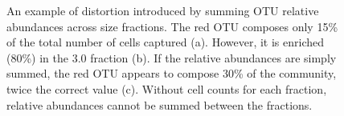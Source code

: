 \begin{figure}
\quad
{}
\caption[Summing relative abundances across size fractions]{An example of distortion introduced by summing OTU relative abundances across size fractions. The red OTU composes only 15\% of the total number of cells captured (a). However, it is enriched (80\%) in the 3.0 \micron{} fraction (b). If the relative abundances are simply summed, the red OTU appears to compose 30\% of the community, twice the correct value (c). Without cell counts for each fraction, relative abundances cannot be summed between the fractions.}
\label{fig:fractionabundances}
\end{figure}
